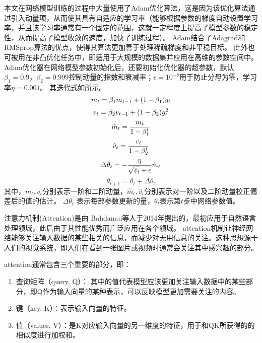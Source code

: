 本文在网络模型训练的过程中大量使用了Adam优化算法\cite{2014Adam}，这是因为该优化算法通过引入动量项，从而使其具有自适应的学习率（能够根据参数的梯度自动设置学习率，并且该学习率通常有一个固定的范围，这就一定程度上提高了模型参数的稳定性，从而提高了模型收敛的速度，加快了训练过程）。
Adam结合了Adagrad和RMSprop算法的优点，使得其算法更加善于处理稀疏梯度和非平稳目标。
此外也可被用在非凸优化任务中，即适用于大规模的数据集并应用在高维的参数空间中。
Adam优化器在网络模型参数初始化后，还要初始化优化器的超参数，默认$\beta_1 = 0.9$，$\beta_2 = 0.999$控制动量的指数和衰减率；$\epsilon = 10^{-8}$用于防止分母为零，学习率$\eta = 0.001$。
其迭代式如所示。
\begin{equation}
  \label{equation:Adamiter:a1}
  \centering
  m_t  = \beta_1 m_{t-1} + (1 - \beta_1) g_t
\end{equation}
\begin{equation}
  \label{equation:Adamiter:a2}
  \centering
  v_t  = \beta_2 v_{t-1} + (1 - \beta_2) g_t^2
\end{equation}
\begin{equation}
  \label{equation:Adamiter:a3}
  \centering  
  \hat{m}_t  = \frac{m_t}{1 - \beta_1^t}
\end{equation}
\begin{equation}
  \label{equation:Adamiter:a4}
  \centering
  \hat{v}_t  = \frac{v_t}{1 - \beta_2^t} 
\end{equation}
\begin{equation}
  \label{equation:Adamiter:a5}
  \centering
  \Delta \theta_t  = -\frac{\eta}{\sqrt{\hat{v}_t} + \epsilon} \hat{m}_t 
\end{equation}
\begin{equation}
  \label{equation:Adamiter:a6}
  \theta_{t+1} = \theta_t + \Delta \theta_t 
\end{equation}
其中，$m_t, v_t$分别表示一阶和二阶动量，$\hat{m}_t, \hat{v}_t$分别表示对一阶以及二阶动量校正偏差后的值的估计。
$\Delta\theta_t$ 表示每部参数更新的量，$\theta_t$表示第$t$步中网络参数值。


注意力机制(Attention)是由 Bahdanau等人于2014年提出的\cite{2014Neural}，最初应用于自然语言处理领域，此后由于其性能优秀而广泛应用在各个领域。
attention机制让神经网络能够关注输入数据的某些相关的信息，而减少对无用信息的关注。这种思想源于人们的视觉系统，即人们在看到一张图片或视频时通常会关注其中感兴趣的部分。

attention通常包含三个重要的部分，即：
\begin{enumerate}
  \item 查询矩阵（query, Q）： 其中的值代表模型应该更加关注输入数据中的某些部分，即Q作为输入向量的某种表示，可以反映模型更加需要关注的内容。
  \item 键（key, K）：表示输入向量的特征。
  \item 值（values, V）：是K对应输入向量的另一维度的特征，用于和QK所获得的的相似度进行加权和。
\end{enumerate}

